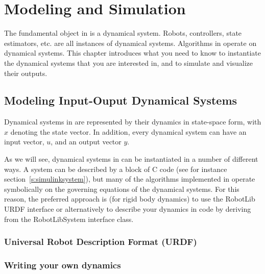 \chapter{Modeling and Simulation}

The fundamental object in \robotlib is a dynamical system.  Robots, 
controllers, state estimators, etc. are all instances of dynamical
systems.  Algorithms in \robotlib operate on dynamical systems.  This
chapter introduces what you need to know to instantiate the dynamical
systems that you are interested in, and to simulate and visualize
their outputs.  

\section{Modeling Input-Ouput Dynamical Systems}

Dynamical systems in \robotlib are represented by their dynamics in
state-space form, with $x$ denoting the state vector.  In addition,
every dynamical system can have an input vector, $u$, and an output
vector $y$. 

\begin{center}
\end{center}

As we will see, dynamical systems in \robotlib can be instantiated in a number of different ways.  A system can be described by a block of C code (see for instance section~\ref{s:simulinksystem}), but many of the algorithms implemented in \robotlib operate symbolically on the governing equations of the dynamical systems.  For this reason, the preferred approach is (for rigid body dynamics) to use the RobotLib URDF interface or alternatively to describe your dynamics in \matlab code by deriving from the RobotLibSystem interface class.


\subsection{Universal Robot Description Format (URDF)}


\subsection{Writing your own dynamics}


